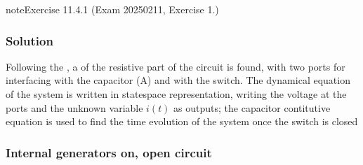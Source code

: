 \documentclass[letterpaper,10pt,english]{jupyterBook}
\begin{document}
 \label{exercise:exam-25-02-11-exe-01}

\begin{sphinxadmonition}{note}{Exercise 11.4.1 (Exam 2025\sphinxhyphen{}02\sphinxhyphen{}11, Exercise 1.)}



\begin{figure}[htbp]
\centering

\noindent{}
\end{figure}
\subsubsection*{Solution}

\sphinxAtStartPar
Following the , a {\hyperref[\detokenize{ch/electrical-engineering-networks-linear:classical-electromagnetism-electrical-engineering-newtork-analysis-thevenin-n-port}]{}} of the resistive part of the circuit is found, with two ports for interfacing with the capacitor (A) and with the switch. The dynamical equation of the system is written in state\sphinxhyphen{}space representation, writing the voltage at the ports and the unknown variable \(i(t)\) as outputs; the capacitor contitutive equation is used to find the time evolution of the system once the switch is closed

\begin{figure}[htbp]
\centering

\noindent{}
\end{figure}
\subsubsection*{Internal generators on, open circuit}


\end{sphinxadmonition}
\end{document}
